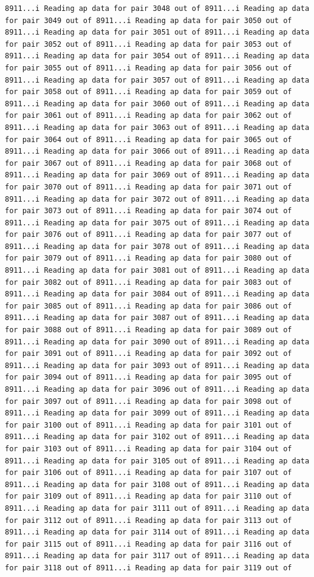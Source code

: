 \documentclass[
]{article}
\begin{document}
\begin{verbatim}
8911...i Reading ap data for pair 3048 out of 8911...i Reading ap data for pair 3049 out of 8911...i Reading ap data for pair 3050 out of 8911...i Reading ap data for pair 3051 out of 8911...i Reading ap data for pair 3052 out of 8911...i Reading ap data for pair 3053 out of 8911...i Reading ap data for pair 3054 out of 8911...i Reading ap data for pair 3055 out of 8911...i Reading ap data for pair 3056 out of 8911...i Reading ap data for pair 3057 out of 8911...i Reading ap data for pair 3058 out of 8911...i Reading ap data for pair 3059 out of 8911...i Reading ap data for pair 3060 out of 8911...i Reading ap data for pair 3061 out of 8911...i Reading ap data for pair 3062 out of 8911...i Reading ap data for pair 3063 out of 8911...i Reading ap data for pair 3064 out of 8911...i Reading ap data for pair 3065 out of 8911...i Reading ap data for pair 3066 out of 8911...i Reading ap data for pair 3067 out of 8911...i Reading ap data for pair 3068 out of 8911...i Reading ap data for pair 3069 out of 8911...i Reading ap data for pair 3070 out of 8911...i Reading ap data for pair 3071 out of 8911...i Reading ap data for pair 3072 out of 8911...i Reading ap data for pair 3073 out of 8911...i Reading ap data for pair 3074 out of 8911...i Reading ap data for pair 3075 out of 8911...i Reading ap data for pair 3076 out of 8911...i Reading ap data for pair 3077 out of 8911...i Reading ap data for pair 3078 out of 8911...i Reading ap data for pair 3079 out of 8911...i Reading ap data for pair 3080 out of 8911...i Reading ap data for pair 3081 out of 8911...i Reading ap data for pair 3082 out of 8911...i Reading ap data for pair 3083 out of 8911...i Reading ap data for pair 3084 out of 8911...i Reading ap data for pair 3085 out of 8911...i Reading ap data for pair 3086 out of 8911...i Reading ap data for pair 3087 out of 8911...i Reading ap data for pair 3088 out of 8911...i Reading ap data for pair 3089 out of 8911...i Reading ap data for pair 3090 out of 8911...i Reading ap data for pair 3091 out of 8911...i Reading ap data for pair 3092 out of 8911...i Reading ap data for pair 3093 out of 8911...i Reading ap data for pair 3094 out of 8911...i Reading ap data for pair 3095 out of 8911...i Reading ap data for pair 3096 out of 8911...i Reading ap data for pair 3097 out of 8911...i Reading ap data for pair 3098 out of 8911...i Reading ap data for pair 3099 out of 8911...i Reading ap data for pair 3100 out of 8911...i Reading ap data for pair 3101 out of 8911...i Reading ap data for pair 3102 out of 8911...i Reading ap data for pair 3103 out of 8911...i Reading ap data for pair 3104 out of 8911...i Reading ap data for pair 3105 out of 8911...i Reading ap data for pair 3106 out of 8911...i Reading ap data for pair 3107 out of 8911...i Reading ap data for pair 3108 out of 8911...i Reading ap data for pair 3109 out of 8911...i Reading ap data for pair 3110 out of 8911...i Reading ap data for pair 3111 out of 8911...i Reading ap data for pair 3112 out of 8911...i Reading ap data for pair 3113 out of 8911...i Reading ap data for pair 3114 out of 8911...i Reading ap data for pair 3115 out of 8911...i Reading ap data for pair 3116 out of 8911...i Reading ap data for pair 3117 out of 8911...i Reading ap data for pair 3118 out of 8911...i Reading ap data for pair 3119 out of 
\end{verbatim}
\end{document}
